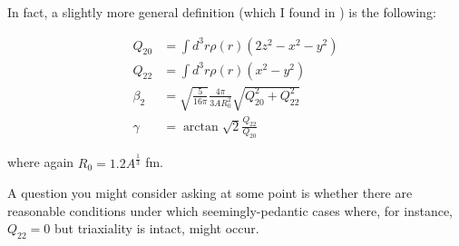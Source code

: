 In fact, a slightly more general definition (which I found in \cite{Afanasjev2018}) is the following:

\begin{align*}
Q_{20} &= \int d^3r\rho(r) (2z^2 - x^2 - y^2) \\
Q_{22} &= \int d^3r\rho(r) (x^2 - y^2) \\
\beta_2 &= \sqrt{\frac{5}{16\pi}}\frac{4\pi}{3AR_0^2}\sqrt{Q_{20}^2 + Q_{22}^2} \\
\gamma &= \arctan \sqrt{2}\frac{Q_{22}}{Q_{20}}
\end{align*}

\noindent where again $R_0=1.2A^\frac{1}{3}$ fm.

A question you might consider asking at some point is whether there are reasonable conditions under which seemingly-pedantic cases where, for instance, $Q_{22}=0$ but triaxiality is intact, might occur.